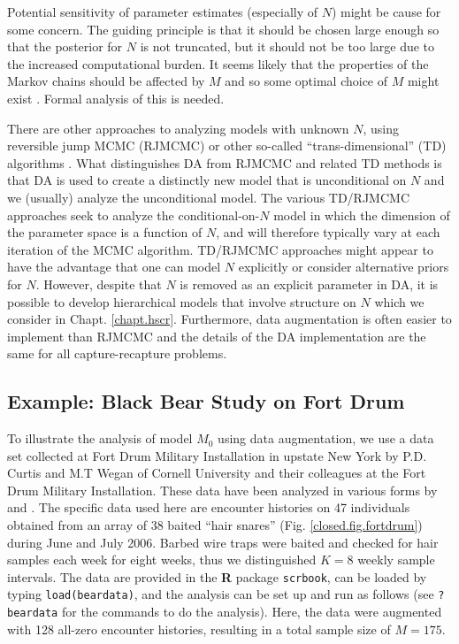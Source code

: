 Potential sensitivity of parameter estimates (especially of $N$) might
be cause for some concern.
The guiding principle is
that it should be chosen large enough so that the posterior for $N$ is
not truncated, but it should not be too large due to the increased 
computational burden. It seems likely that the properties of the
Markov chains should be affected by $M$ and so some optimal choice of
$M$ might exist \citep{gopalaswamy:2012}.
Formal analysis of this is needed.

There are other approaches to analyzing models with unknown $N$, using
reversible jump MCMC (RJMCMC) or other so-called ``trans-dimensional''
(TD) algorithms \citep{king_brooks:2001, durban_elston:2005,
  king_etal:2008, schofield_barker:2008, wright_etal:2009}.  What
distinguishes DA from RJMCMC and related TD methods is that DA is used
to create a distinctly new model that is unconditional on $N$ and we
(usually) analyze the unconditional model. The various TD/RJMCMC
approaches seek to analyze the conditional-on-$N$ model in which the
dimension of the parameter space is a function of $N$, and will
therefore typically vary at each iteration of the MCMC
algorithm. TD/RJMCMC approaches might appear to have the advantage
that one can model $N$ explicitly or consider alternative priors for
$N$. However, despite that $N$ is removed as an explicit parameter in
DA, it is possible to develop hierarchical models that involve
structure on $N$ \citep{converse_royle:2012, royle_etal:2012arXiv} which
we consider in Chapt. \ref{chapt.hscr}. Furthermore, data augmentation
is often easier to implement than RJMCMC and the details of the
DA implementation are the same for all capture-recapture problems.


\subsection{Example: Black Bear Study on Fort Drum}

To illustrate the analysis of model $M_0$ using data augmentation, we use
a data set collected at Fort Drum Military Installation in upstate New
York by P.D. Curtis and M.T Wegan of Cornell University and
their colleagues at the Fort Drum Military Installation.
These data have been analyzed in various forms by
\citet{wegan:2008,gardner_etal:2009} and \citet{gardner_etal:2010jwm}.
The specific data used here are encounter histories on 47 individuals
obtained from an array of 38 baited ``hair snares''
(Fig. \ref{closed.fig.fortdrum}) during June and July 2006.  Barbed wire
traps were baited and checked for hair samples each week for eight
weeks, thus we distinguished $K=8$ weekly sample intervals. The data are provided
in the {\bf R} package \mbox{\tt scrbook}, can be loaded by typing
\mbox{\tt load(beardata)}, 
and the analysis can be set up and run as
follows (see \mbox{\tt ?beardata} for the commands to do the
analysis). 
Here, the data were augmented with 128
all-zero encounter histories, resulting in a total sample size of $M=175$.

